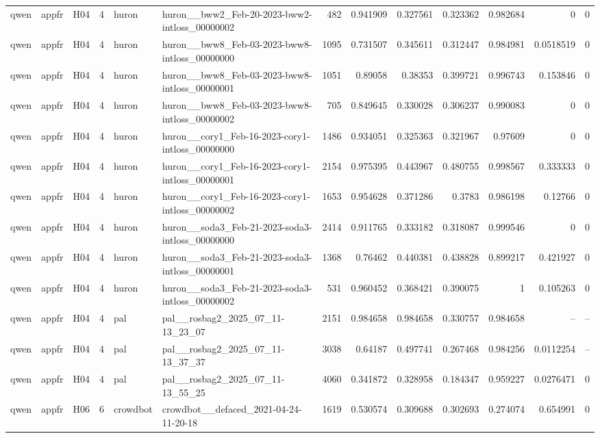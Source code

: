 \begin{longtable}{lllrllrrrrrrr}
qwen & appfr & H04 & 4 & huron & huron\_\_bww2\_Feb-20-2023-bww2-intloss\_00000002 & 482 & 0.941909 & 0.327561 & 0.323362 & 0.982684 & 0 & 0 \\
qwen & appfr & H04 & 4 & huron & huron\_\_bww8\_Feb-03-2023-bww8-intloss\_00000000 & 1095 & 0.731507 & 0.345611 & 0.312447 & 0.984981 & 0.0518519 & 0 \\
qwen & appfr & H04 & 4 & huron & huron\_\_bww8\_Feb-03-2023-bww8-intloss\_00000001 & 1051 & 0.89058 & 0.38353 & 0.399721 & 0.996743 & 0.153846 & 0 \\
qwen & appfr & H04 & 4 & huron & huron\_\_bww8\_Feb-03-2023-bww8-intloss\_00000002 & 705 & 0.849645 & 0.330028 & 0.306237 & 0.990083 & 0 & 0 \\
qwen & appfr & H04 & 4 & huron & huron\_\_cory1\_Feb-16-2023-cory1-intloss\_00000000 & 1486 & 0.934051 & 0.325363 & 0.321967 & 0.97609 & 0 & 0 \\
qwen & appfr & H04 & 4 & huron & huron\_\_cory1\_Feb-16-2023-cory1-intloss\_00000001 & 2154 & 0.975395 & 0.443967 & 0.480755 & 0.998567 & 0.333333 & 0 \\
qwen & appfr & H04 & 4 & huron & huron\_\_cory1\_Feb-16-2023-cory1-intloss\_00000002 & 1653 & 0.954628 & 0.371286 & 0.3783 & 0.986198 & 0.12766 & 0 \\
qwen & appfr & H04 & 4 & huron & huron\_\_soda3\_Feb-21-2023-soda3-intloss\_00000000 & 2414 & 0.911765 & 0.333182 & 0.318087 & 0.999546 & 0 & 0 \\
qwen & appfr & H04 & 4 & huron & huron\_\_soda3\_Feb-21-2023-soda3-intloss\_00000001 & 1368 & 0.76462 & 0.440381 & 0.438828 & 0.899217 & 0.421927 & 0 \\
qwen & appfr & H04 & 4 & huron & huron\_\_soda3\_Feb-21-2023-soda3-intloss\_00000002 & 531 & 0.960452 & 0.368421 & 0.390075 & 1 & 0.105263 & 0 \\
qwen & appfr & H04 & 4 & pal & pal\_\_rosbag2\_2025\_07\_11-13\_23\_07 & 2151 & 0.984658 & 0.984658 & 0.330757 & 0.984658 & -- & -- \\
qwen & appfr & H04 & 4 & pal & pal\_\_rosbag2\_2025\_07\_11-13\_37\_37 & 3038 & 0.64187 & 0.497741 & 0.267468 & 0.984256 & 0.0112254 & -- \\
qwen & appfr & H04 & 4 & pal & pal\_\_rosbag2\_2025\_07\_11-13\_55\_25 & 4060 & 0.341872 & 0.328958 & 0.184347 & 0.959227 & 0.0276471 & 0 \\
qwen & appfr & H06 & 6 & crowdbot & crowdbot\_\_defaced\_2021-04-24-11-20-18 & 1619 & 0.530574 & 0.309688 & 0.302693 & 0.274074 & 0.654991 & 0 \\

\end{longtable}
